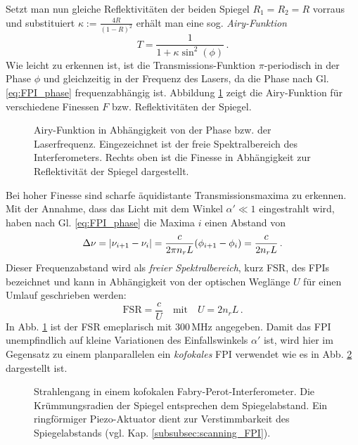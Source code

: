Setzt man nun gleiche Reflektivitäten der beiden Spiegel $R_1=R_2=R$ vorraus und
substituiert $\kappa:=\frac{4R}{(1-R)^2}$ erhält man eine sog.
\textit{Airy-Funktion}
\begin{equation}\label{eq:FPI_airy-funktion}
	T=\frac{1}{1+\kappa\sin^2{(\phi)}}\,.
\end{equation}
Wie leicht zu erkennen ist, ist die Transmissions-Funktion $\pi$-periodisch in
der Phase $\phi$ und gleichzeitig in der Frequenz des Lasers, da die Phase nach
Gl. \eqref{eq:FPI_phase} frequenzabhängig ist. Abbildung
\ref{fig:airy-funktion} zeigt die Airy-Funktion für verschiedene Finessen
$F$ bzw. Reflektivitäten der Spiegel.
\begin{figure}[h]
	\centering
	\footnotesize
	
	\caption[Airy-Funktion]{Airy-Funktion
	in Abhängigkeit von der Phase bzw.
	der Laserfrequenz. Eingezeichnet ist
	der freie Spektralbereich des
	Interferometers. Rechts oben ist die
	Finesse in Abhängigkeit zur
	Reflektivität der Spiegel dargestellt.}\label{fig:airy-funktion}
\end{figure}
Bei hoher Finesse sind scharfe
äquidistante Transmissionsmaxima zu erkennen. Mit der Annahme, dass das Licht
mit dem Winkel $\alpha'\ll1$ eingestrahlt wird, haben nach Gl.
\eqref{eq:FPI_phase} die Maxima $i$ einen Abstand von
\begin{equation}\label{eq:FPI_transmissionsmaxima}
	\Delta\nu=\left|\nu_{i+1}-\nu_i\right|=\frac{c}{2\pi	n_rL}(\phi_{i+1}-\phi_i)=\frac{c}{2n_rL}\,.
\end{equation}
Dieser Frequenzabstand wird als \textit{freier Spektralbereich}, kurz FSR, des
FPIs bezeichnet und kann in Abhängigkeit von der optischen Weglänge $U$ für
einen Umlauf geschrieben werden:
\begin{equation}\label{eq:FPI_FSR_01}
	\text{FSR}=\frac{c}{U}
	\quad\text{mit}\quad
	U=2n_rL\,.
\end{equation}
In Abb. \ref{fig:airy-funktion} ist der FSR emeplarisch mit $300\,$MHz
angegeben. Damit das FPI unempfindlich auf kleine Variationen des Einfallswinkels $\alpha'$
ist, wird hier im Gegensatz zu einem planparallelen ein \textit{kofokales} FPI
verwendet wie es in Abb. \ref{fig:FPI_kofokal} dargestellt ist.
\begin{figure}[h]
 	\centering
	\caption[FPI - kofokal]{Strahlengang in einem
	kofokalen Fabry-Perot-Interferometer. Die
	Krümmungsradien der Spiegel entsprechen dem
	Spiegelabstand. Ein ringförmiger Piezo-Aktuator dient zur
	Verstimmbarkeit des Spiegelabstands (vgl. Kap.
	\ref{subsubsec:scanning_FPI}).}\label{fig:FPI_kofokal}
\end{figure}
